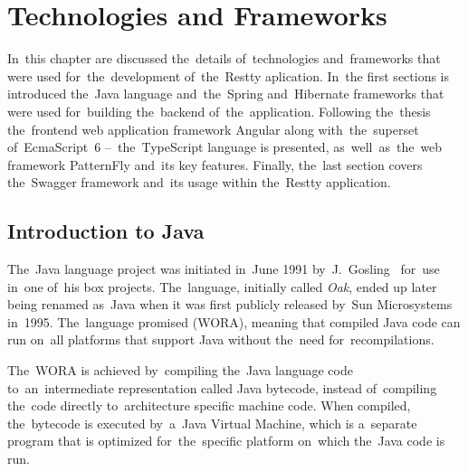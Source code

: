 


\chapter{Technologies and Frameworks}
\label{Technologies}
In~this chapter are discussed the~details of~technologies and~frameworks that
were used for~the~development of~the~Restty aplication. In~the first sections is
introduced the~Java language and~the~Spring and~Hibernate frameworks that were
used for~building the~backend of~the~application. Following the~thesis
the~frontend web application framework Angular along with~the~superset
of~EcmaScript~6 --~the~TypeScript language is presented, as~well~as~the~web
framework PatternFly and~its key features. Finally, the~last section covers
the~Swagger framework and~its usage within the~Restty application.



\section{Introduction to Java}
The~Java language project was initiated in~June 1991 by~J.~Gosling~\cite{Java}
for~use in~one of~his  box projects. The~language, initially called
\textit{Oak}, ended up later being renamed as~Java when it was first publicly
released by~Sun Microsystems in~1995. The~language promised  (WORA), meaning that compiled Java code can run on~all platforms that
support Java without the~need for~recompilations.

The~WORA is achieved by~compiling the~Java language code to~an~intermediate
representation called Java bytecode, instead of~compiling the~code directly
to~architecture specific machine code. When compiled, the~bytecode is executed
by~a~Java Virtual Machine, which is a~separate program that is optimized
for~the~specific platform on~which the~Java code is run.


